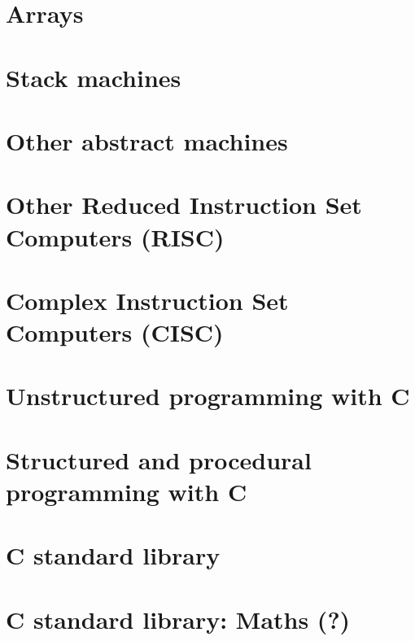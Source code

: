 \documentclass[oneside]{book}
\begin{document}
\part{Arrays}


\part{Stack machines}


\part{Other abstract machines}


\part{Other Reduced Instruction Set Computers (RISC)}




\part{Complex Instruction Set Computers (CISC)}







\part{Unstructured programming with C}













\part{Structured and procedural programming with C}






\part{C standard library}

\part{C standard library: Maths (?)}



\end{document}
